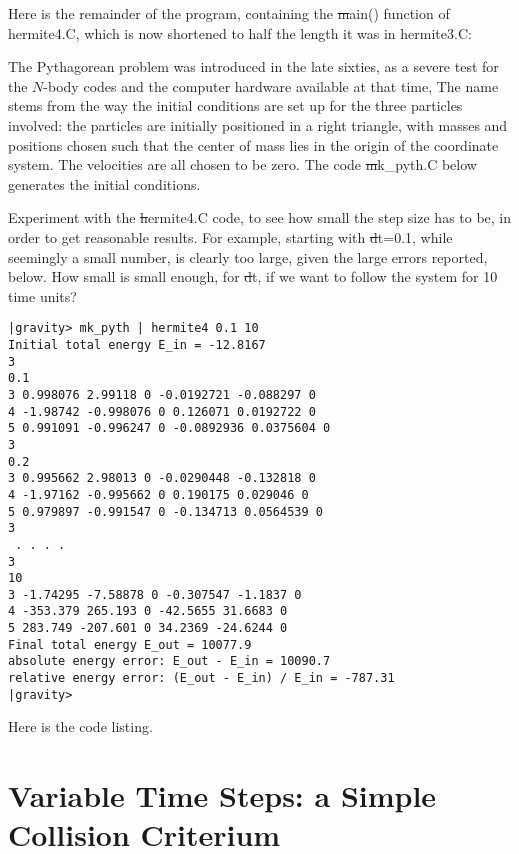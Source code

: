 Here is the remainder of the program, containing the {\st main()}
function of {hermite4.C}, which is now shortened to half the length it
was in {hermite3.C}:


\begin{Exercise}\label{ex:pp1}
The Pythagorean problem was introduced in the late sixties, as a
severe test for the $N$-body codes and the computer hardware available
at that time, The name stems from the way the initial conditions are
set up for the three particles involved: the particles are initially
positioned in a right triangle, with masses and positions chosen such
that the center of mass lies in the origin of the coordinate system.
The velocities are all chosen to be zero.  The code {\st mk\_pyth.C}
below generates the initial conditions.

Experiment with the {\st hermite4.C} code, to see how small the step
size has to be, in order to get reasonable results.  For example,
starting with {\st dt=0.1}, while seemingly a small number, is clearly
too large, given the large errors reported, below.  How small is small
enough, for {\st dt}, if we want to follow the system for 10 time units?
\end{Exercise}

\begin{small}
\begin{verbatim}
|gravity> mk_pyth | hermite4 0.1 10
Initial total energy E_in = -12.8167
3
0.1
3 0.998076 2.99118 0 -0.0192721 -0.088297 0 
4 -1.98742 -0.998076 0 0.126071 0.0192722 0 
5 0.991091 -0.996247 0 -0.0892936 0.0375604 0 
3
0.2
3 0.995662 2.98013 0 -0.0290448 -0.132818 0 
4 -1.97162 -0.995662 0 0.190175 0.029046 0 
5 0.979897 -0.991547 0 -0.134713 0.0564539 0 
3
 . . . .
3
10
3 -1.74295 -7.58878 0 -0.307547 -1.1837 0 
4 -353.379 265.193 0 -42.5655 31.6683 0 
5 283.749 -207.601 0 34.2369 -24.6244 0 
Final total energy E_out = 10077.9
absolute energy error: E_out - E_in = 10090.7
relative energy error: (E_out - E_in) / E_in = -787.31
|gravity> 
\end{verbatim}
\end{small}

Here is the code listing.


\section{Variable Time Steps: a Simple Collision Criterium}

